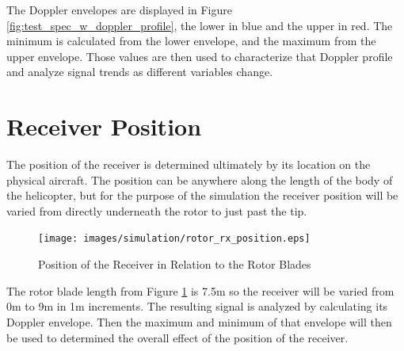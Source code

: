 The Doppler envelopes are displayed in Figure \ref{fig:test_spec_w_doppler_profile}, the lower in blue and the upper in red. The minimum is calculated from the lower envelope, and the maximum from the upper envelope. Those values are then used to characterize that Doppler profile and analyze signal trends as different variables change.

\section{Receiver Position}
The position of the receiver is determined ultimately by its location on the physical aircraft. The position can be anywhere along the length of the body of the helicopter, but for the purpose of the simulation the receiver position will be varied from directly underneath the rotor to just past the tip. 

\begin{figure}
	\begin{center}
		\texttt{[image: images/simulation/rotor\_rx\_position.eps]}
		\caption{Position of the Receiver in Relation to the Rotor Blades}
		\label{fig:rx_position_image}
	\end{center}
\end{figure}

The rotor blade length from Figure \ref{fig:rx_position_image} is 7.5m so the receiver will be varied from 0m to 9m in 1m increments. The resulting signal is analyzed by calculating its Doppler envelope. Then the maximum and minimum of that envelope will then be used to determined the overall effect of the position of the receiver.

